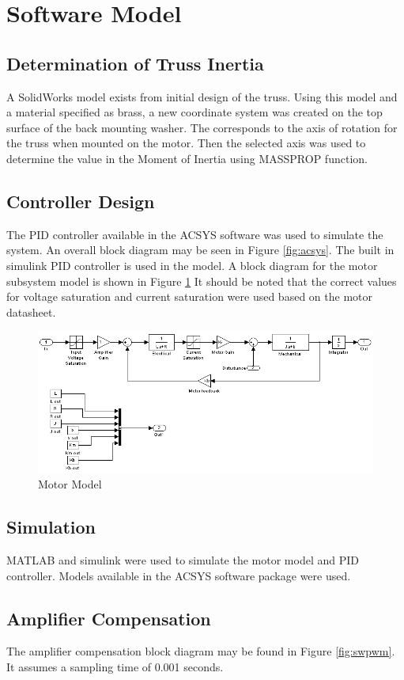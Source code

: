 \section{Software Model}
 
\subsection{Determination of Truss Inertia}

A SolidWorks model exists from initial design of the truss.
Using this model and a material specified as brass, a new coordinate system was created on the top surface of the back mounting washer. 
The corresponds to the axis of rotation for the truss when mounted on the motor.
Then the selected axis was used to determine the value in the Moment of Inertia using MASSPROP function.

\subsection{Controller Design}

The PID controller available in the ACSYS software was used to simulate the system. 
An overall block diagram may be seen in Figure \ref{fig:acsys}.
The built in simulink PID controller is used in the model.
A block diagram for the motor subsystem model is shown in Figure \ref{fig:acsys2}
It should be noted that the correct values for voltage saturation and current saturation were used based on the motor datasheet.

\begin{figure}[ht]
    \centering
    \includegraphics[width=.95\textwidth]{images/acsys2.PNG}
    \caption{Motor Model}
    \label{fig:acsys2}
\end{figure}

\subsection{Simulation}

MATLAB and simulink were used to simulate the motor model and PID controller.
Models available in the ACSYS software package were used.

\subsection{Amplifier Compensation}

The amplifier compensation block diagram may be found in Figure \ref{fig:swpwm}.
It assumes a sampling time of 0.001 seconds.



